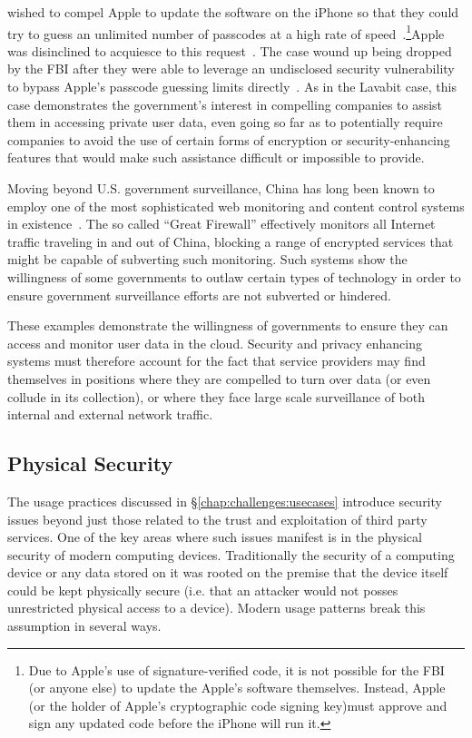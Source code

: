 \begin{packed_desc}
  wished to compel Apple to update the software on the iPhone so that
  they could try to guess an unlimited number of passcodes at a high
  rate of speed~\cite{eff-applecrypto}.\footnote{Due to Apple's use of
    signature-verified code, it is not possible for the FBI (or anyone
    else) to update the Apple's software themselves. Instead, Apple
    (or the holder of Apple's cryptographic code signing key)must
    approve and sign any updated code before the iPhone will run
    it.}Apple was disinclined to acquiesce to this
  request~\cite{apple-fbiletter}. The case wound up being dropped by
  the FBI after they were able to leverage an undisclosed security
  vulnerability to bypass Apple's passcode guessing limits
  directly~\cite{ars-fbi-greyhats, ars-fbi-breakthrough}. As in the
  Lavabit case, this case demonstrates the government's interest in
  compelling companies to assist them in accessing private user data,
  even going so far as to potentially require companies to avoid the
  use of certain forms of encryption or security-enhancing features
  that would make such assistance difficult or impossible to provide.
\item[The Great Firewall:] Moving beyond U.S. government surveillance,
  China has long been known to employ one of the most sophisticated
  web monitoring and content control systems in
  existence~\cite{rsf-china}. The so called ``Great Firewall''
  effectively monitors all Internet traffic traveling in and out of
  China, blocking a range of encrypted services that might be capable
  of subverting such monitoring. Such systems show the willingness of
  some governments to outlaw certain types of technology in order to
  ensure government surveillance efforts are not subverted or
  hindered.
\end{packed_desc}

These examples demonstrate the willingness of governments to ensure
they can access and monitor user data in the cloud. Security and
privacy enhancing systems must therefore account for the fact that
service providers may find themselves in positions where they are
compelled to turn over data (or even collude in its collection), or
where they face large scale surveillance of both internal and external
network traffic.

\subsection{Physical Security}

The usage practices discussed in \S\ref{chap:challenges:usecases}
introduce security issues beyond just those related to the trust and
exploitation of third party services. One of the key areas where such
issues manifest is in the physical security of modern computing
devices. Traditionally the security of a computing device or any data
stored on it was rooted on the premise that the device itself could be
kept physically secure (i.e. that an attacker would not posses
unrestricted physical access to a device). Modern usage patterns break
this assumption in several ways.

